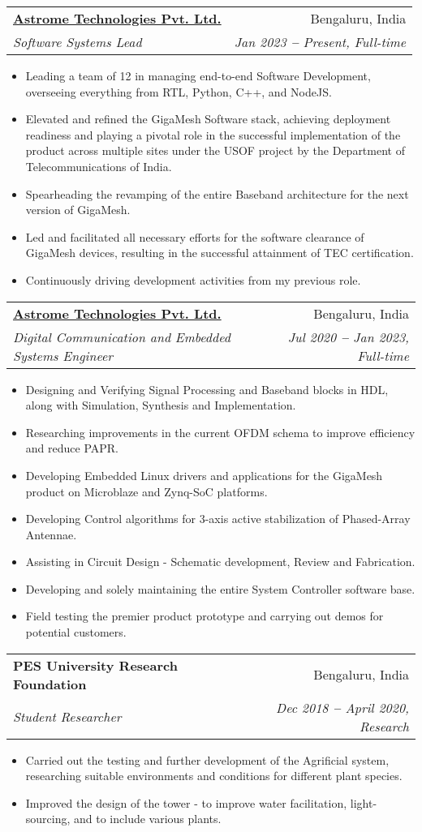 \documentclass[letterpaper,11pt]{article}
\makeatletter
\newcommand{\resumeItem}[1]{
  \item\small{
    {#1 \vspace{-2pt}}
  }
}
\newcommand{\resumeSubheading}[4]{
  \vspace{-2pt}\item
    \begin{tabular*}{0.97\textwidth}[t]{l@{\extracolsep{\fill}}r}
      \textbf{#1} & #2 \\
      \textit{\small#3} & \textit{\small #4} \\
    \end{tabular*}\vspace{-7pt}
}
\newcommand{\resumeItemListStart}{\begin{itemize}}
\newcommand{\resumeItemListEnd}{\end{itemize}\vspace{-5pt}}
\makeatother
\begin{document}
    \resumeSubheading
      {\href{https://astrome.co/}{Astrome Technologies Pvt. Ltd.}}{Bengaluru, India}
      {Software Systems Lead}{Jan 2023 \textbf{--} Present, Full-time}
        \resumeItemListStart
            \resumeItem{Leading a team of 12 in managing end-to-end Software Development, overseeing everything from RTL, Python, C++, and NodeJS.}
            \resumeItem{Elevated and refined the GigaMesh Software stack, achieving deployment readiness and playing a pivotal role in the successful implementation of the product across multiple sites under the USOF project by the Department of Telecommunications of India.}
            \resumeItem{Spearheading the revamping of the entire Baseband architecture for the next version of GigaMesh.}
            \resumeItem{Led and facilitated all necessary efforts for the software clearance of GigaMesh devices, resulting in the successful attainment of TEC certification.}
            \resumeItem{Continuously driving development activities from my previous role.}
        \resumeItemListEnd

    \resumeSubheading
      {\href{https://astrome.co/}{Astrome Technologies Pvt. Ltd.}}{Bengaluru, India}
      {Digital Communication and Embedded Systems Engineer}{Jul 2020 \textbf{--} Jan 2023, Full-time}
        \resumeItemListStart
            \resumeItem{Designing and Verifying Signal Processing and Baseband blocks in HDL, along with Simulation, Synthesis and Implementation.}
            \resumeItem{Researching improvements in the current OFDM schema to improve efficiency and reduce PAPR.}
            \resumeItem{Developing Embedded Linux drivers and applications for the GigaMesh product on Microblaze and Zynq-SoC platforms.}
            \resumeItem{Developing Control algorithms for 3-axis active stabilization of Phased-Array Antennae.}
            \resumeItem{Assisting in Circuit Design - Schematic development, Review and Fabrication.}
            \resumeItem{Developing and solely maintaining the entire System Controller software base.}
            \resumeItem{Field testing the premier product prototype and carrying out demos for potential customers.}
        \resumeItemListEnd

    \resumeSubheading
      {PES University Research Foundation}{Bengaluru, India}
      {Student Researcher}{Dec 2018 \textbf{--} April 2020, Research}
        \resumeItemListStart
            \resumeItem{Carried out the testing and further development of the Agrificial system, researching suitable environments and conditions for different plant species.}
            \resumeItem{Improved the design of the tower - to improve water facilitation, light-sourcing, and to include various plants.}
        \resumeItemListEnd
\end{document}
